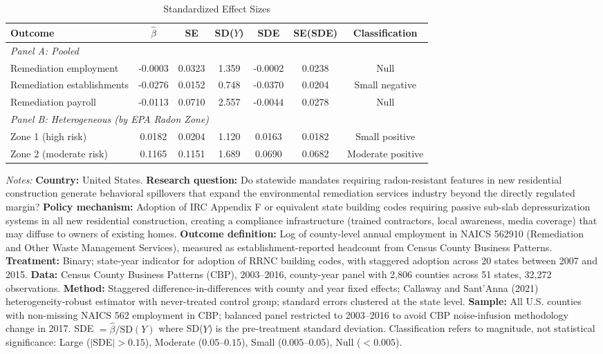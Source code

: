 \begin{table}[htbp]
\centering
\caption{Standardized Effect Sizes}
\label{tab:sde}
\begin{adjustbox}{max width=\textwidth}
\begin{tabular}{lcccccc}
\hline\hline
Outcome & $\hat{\beta}$ & SE & SD($Y$) & SDE & SE(SDE) & Classification \\
\hline
\multicolumn{7}{l}{\textit{Panel A: Pooled}} \\
Remediation employment & -0.0003 & 0.0323 & 1.359 & -0.0002 & 0.0238 & Null \\
Remediation establishments & -0.0276 & 0.0152 & 0.748 & -0.0370 & 0.0204 & Small negative \\
Remediation payroll & -0.0113 & 0.0710 & 2.557 & -0.0044 & 0.0278 & Null \\
[6pt]
\multicolumn{7}{l}{\textit{Panel B: Heterogeneous (by EPA Radon Zone)}} \\
Zone 1 (high risk) & 0.0182 & 0.0204 & 1.120 & 0.0163 & 0.0182 & Small positive \\
Zone 2 (moderate risk) & 0.1165 & 0.1151 & 1.689 & 0.0690 & 0.0682 & Moderate positive \\
\hline\hline
\end{tabular}
\end{adjustbox}
\begin{tablenotes}[flushleft]
\small
\item \textit{Notes:} \textbf{Country:} United States. \textbf{Research question:} Do statewide mandates requiring radon-resistant features in new residential construction generate behavioral spillovers that expand the environmental remediation services industry beyond the directly regulated margin? \textbf{Policy mechanism:} Adoption of IRC Appendix F or equivalent state building codes requiring passive sub-slab depressurization systems in all new residential construction, creating a compliance infrastructure (trained contractors, local awareness, media coverage) that may diffuse to owners of existing homes. \textbf{Outcome definition:} Log of county-level annual employment in NAICS 562910 (Remediation and Other Waste Management Services), measured as establishment-reported headcount from Census County Business Patterns. \textbf{Treatment:} Binary; state-year indicator for adoption of RRNC building codes, with staggered adoption across 20 states between 2007 and 2015. \textbf{Data:} Census County Business Patterns (CBP), 2003--2016, county-year panel with 2,806 counties across 51 states, 32,272 observations. \textbf{Method:} Staggered difference-in-differences with county and year fixed effects; Callaway and Sant'Anna (2021) heterogeneity-robust estimator with never-treated control group; standard errors clustered at the state level. \textbf{Sample:} All U.S. counties with non-missing NAICS 562 employment in CBP; balanced panel restricted to 2003--2016 to avoid CBP noise-infusion methodology change in 2017. SDE $= \hat{\beta} / \text{SD}(Y)$ where SD($Y$) is the pre-treatment standard deviation. Classification refers to magnitude, not statistical significance: Large ($|$SDE$| > 0.15$), Moderate ($0.05$--$0.15$), Small ($0.005$--$0.05$), Null ($< 0.005$).
\end{tablenotes}
\end{table}

